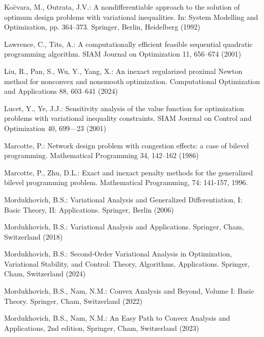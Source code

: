 \documentclass[11pt,a4paper]{article}
\theoremstyle{plain}
\begin{document}
\begin{thebibliography}{}
Ko\u cvara, M., Outrata, J.V.:  
A nondifferentiable approach to the solution of optimum design problems with variational inequalities. 
In: System Modelling and Optimization, pp. 364--373. Springer, Berlin, Heidelberg (1992)

Lawrence, C., Tits, A.: 
A computationally efficient feasible sequential quadratic programming algorithm. 
SIAM Journal on Optimization 11, 656--674 (2001)

Liu, R., Pan, S., Wu, Y., Yang, X.:  
An inexact regularized proximal Newton method for nonconvex and nonsmooth optimization. 
Computational Optimization and Applications 88, 603–641 (2024)





Lucet, Y., Ye, J.J.: 
Sensitivity analysis of the value function for optimization problems with variational inequality
constraints. SIAM Journal on Control and Optimization 40, 699–--23 (2001)

Marcotte, P.: 
Network design problem with congestion effects: a case of bilevel programming. 
Mathematical Programming 34, 142--162 (1986)

Marcotte, P., Zhu, D.L.: 
Exact and inexact penalty methods for the generalized bilevel programming problem. 
Mathematical Programming, 74: 141-157, 1996.

Mordukhovich, B.S.: 
Variational Analysis and Generalized Differentiation, I: Basic Theory, II: Applications. 
Springer, Berlin (2006)

Mordukhovich, B.S.: 
Variational Analysis and Applications. 
Springer, Cham, Switzerland (2018)

Mordukhovich, B.S.: 
Second-Order Variational Analysis in Optimization, Variational Stability, and Control: Theory, Algorithms, Applications.  Springer, Cham, Switzerland  (2024)

Mordukhovich, B.S., Nam, N.M.: 
Convex Analysis and Beyond, Volume I: Basic Theory. 
Springer, Cham, Switzerland (2022)

Mordukhovich, B.S., Nam, N.M.: 
An Easy Path to Convex Analysis and Applications, 2nd edition, 
Springer, Cham, Switzerland (2023)


\end{thebibliography}
\end{document}
